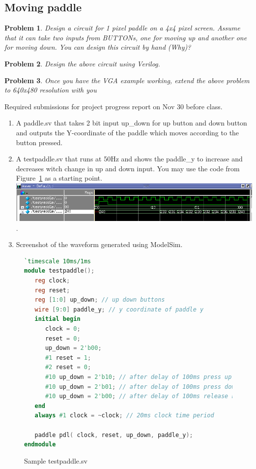 \documentclass{article}
\newtheorem{prob}{Problem}
\begin{document}
\subsection{Moving paddle}

\begin{prob}
 Design a circuit for 1 pixel paddle on a 4x4 pixel screen. Assume that it can
 take two inputs from BUTTONs, one for moving up and another one for moving
 down. You can design this circuit by hand (Why)?
\end{prob}

\begin{prob}
  Design the above circuit using Verilog.
\end{prob}

\begin{prob}
  Once you have the VGA example working, extend the above problem to 640x480
  resolution with you
\end{prob}

{\color{red}
  Required submissions for project progress report on Nov 30 before class.
  \begin{enumerate}
  \item A paddle.sv that takes 2 bit input up\_down for up button and down
    button and outputs the Y-coordinate of the paddle which moves according to
    the button pressed.
  \item A testpaddle.sv that runs at 50Hz and shows the paddle\_y to increase and
    decreases witch change in up and down input. You
    may use the code from Figure~\ref{lst:testpaddle.sv} as a starting point.\\
    \includegraphics[width=\linewidth]{./media/testpaddle-up-down-wave.png}.
  \item Screenshot of the waveform generated using ModelSim.
  \end{enumerate}
}

\begin{figure}
\begin{lstlisting}[language=verilog]
`timescale 10ms/1ms
module testpaddle();
   reg clock;
   reg reset;
   reg [1:0] up_down; // up down buttons
   wire [9:0] paddle_y; // y coordinate of paddle y
   initial begin
      clock = 0;
      reset = 0;
      up_down = 2'b00;
      #1 reset = 1;
      #2 reset = 0;
      #10 up_down = 2'b10; // after delay of 100ms press up
      #10 up_down = 2'b01; // after delay of 100ms press down
      #10 up_down = 2'b00; // after delay of 100ms release both
   end
   always #1 clock = ~clock; // 20ms clock time period

   paddle pdl( clock, reset, up_down, paddle_y);
endmodule
\end{lstlisting}
\caption{Sample testpaddle.sv}
\label{lst:testpaddle.sv}
\end{figure}
\end{document}
